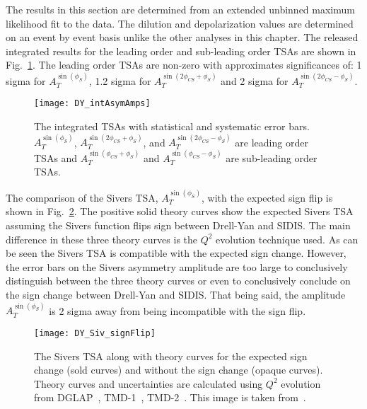 The results in this section are determined from an extended unbinned maximum
likelihood fit to the data.  The dilution and depolarization values are
determined on an event by event basis unlike the other analyses in this chapter.
The released integrated results for the leading order and sub-leading order TSAs
are shown in Fig.~\ref{fig::DY_intAsymAmps}.  The leading order TSAs are
non-zero with approximates significances of: 1 sigma for $A_T^{\sin(\phi_S)}$,
1.2 sigma for $A_T^{\sin(2\phi_{CS}+\phi_S)}$ and 2 sigma for
$A_T^{\sin(2\phi_{CS}-\phi_S)}$.

\begin{figure}[h!t]
  \centering \texttt{[image: DY\_intAsymAmps]}
  \caption{The integrated TSAs with statistical and systematic error bars.
    $A_T^{\sin(\phi_S)}$, $A_T^{\sin(2\phi_{CS}+\phi_S)}$, and
    $A_T^{\sin(2\phi_{CS}-\phi_S)}$ are leading order TSAs and
    $A_T^{\sin(\phi_{CS}+\phi_S)}$ and $A_T^{\sin(\phi_{CS}-\phi_S)}$ are
    sub-leading order TSAs.}
  \label{fig::DY_intAsymAmps}
\end{figure}

The comparison of the Sivers TSA, $A_T^{\sin(\phi_S)}$, with the expected sign
flip is shown in Fig.~\ref{fig::DY_Siv_signFlip}.  The positive solid theory
curves show the expected Sivers TSA assuming the Sivers function flips sign
between Drell-Yan and SIDIS.  The main difference in these three theory curves
is the $Q^2$ evolution technique used.  As can be seen the Sivers TSA is
compatible with the expected sign change.  However, the error bars on the Sivers
asymmetry amplitude are too large to conclusively distinguish between the three
theory curves or even to conclusively conclude on the sign change between
Drell-Yan and SIDIS.  That being said, the amplitude $A_T^{\sin(\phi_S)}$ is 2
sigma away from being incompatible with the sign flip.

\begin{figure}[h!t]
  \centering \texttt{[image: DY\_Siv\_signFlip]}
  \caption{The Sivers TSA along with theory curves for the expected sign change
    (sold curves) and without the sign change (opaque curves).  Theory curves
    and uncertainties are calculated using $Q^2$ evolution from
    DGLAP~\cite{Anselmino:2016uie}, TMD-1~\cite{Echevarria:2014xaa},
    TMD-2~\cite{Sun:2013hua}.  This image is taken from~\cite{compassDYpaper}.}
  \label{fig::DY_Siv_signFlip}
\end{figure}


